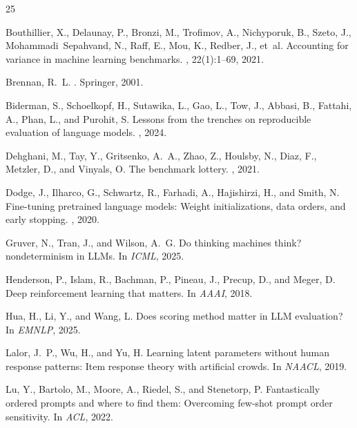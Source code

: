 \documentclass[11pt,letterpaper]{article}
\begin{document}
\begin{thebibliography}{25}

Bouthillier, X., Delaunay, P., Bronzi, M., Trofimov, A., Nichyporuk, B., Szeto, J., Mohammadi~Sepahvand, N., Raff, E., Mou, K., Redber, J., et~al.
\newblock Accounting for variance in machine learning benchmarks.
, 22(1):1--69, 2021.

Brennan, R.~L.
.
\newblock Springer, 2001.

Biderman, S., Schoelkopf, H., Sutawika, L., Gao, L., Tow, J., Abbasi, B., Fattahi, A., Phan, L., and Purohit, S.
\newblock Lessons from the trenches on reproducible evaluation of language models.
, 2024.

Dehghani, M., Tay, Y., Gritsenko, A.~A., Zhao, Z., Houlsby, N., Diaz, F., Metzler, D., and Vinyals, O.
\newblock The benchmark lottery.
, 2021.

Dodge, J., Ilharco, G., Schwartz, R., Farhadi, A., Hajishirzi, H., and Smith, N.
\newblock Fine-tuning pretrained language models: Weight initializations, data orders, and early stopping.
, 2020.

Gruver, N., Tran, J., and Wilson, A.~G.
\newblock Do thinking machines think? nondeterminism in LLMs.
\newblock In {\em ICML}, 2025.

Henderson, P., Islam, R., Bachman, P., Pineau, J., Precup, D., and Meger, D.
\newblock Deep reinforcement learning that matters.
\newblock In {\em AAAI}, 2018.

Hua, H., Li, Y., and Wang, L.
\newblock Does scoring method matter in LLM evaluation?
\newblock In {\em EMNLP}, 2025.

Lalor, J.~P., Wu, H., and Yu, H.
\newblock Learning latent parameters without human response patterns: Item response theory with artificial crowds.
\newblock In {\em NAACL}, 2019.

Lu, Y., Bartolo, M., Moore, A., Riedel, S., and Stenetorp, P.
\newblock Fantastically ordered prompts and where to find them: Overcoming few-shot prompt order sensitivity.
\newblock In {\em ACL}, 2022.


\end{thebibliography}
\end{document}
